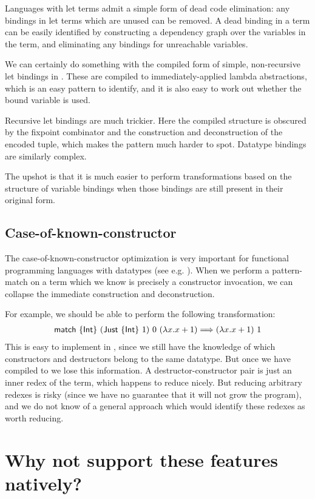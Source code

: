 Languages with let terms admit a simple form of dead code elimination: any
bindings in let terms which are unused can be removed. A dead binding in a
\FIR{} term can be easily identified by
constructing a dependency graph over the variables in the term, and eliminating
any bindings for unreachable variables.

We can certainly do something with the compiled form of simple, non-recursive let bindings
in \FOMF{}. These are compiled to immediately-applied
lambda abstractions, which is an easy pattern to identify, and it is also
easy to work out whether the bound variable is used.

Recursive let bindings are much trickier. Here the compiled structure is
obscured by the fixpoint combinator and the construction and deconstruction of
the encoded tuple, which makes the pattern much harder to spot. Datatype
bindings are similarly complex.

The upshot is that it is much easier to perform transformations based on the
structure of variable bindings when those bindings are still present in their
original form.

\subsection{Case-of-known-constructor}

The case-of-known-constructor optimization is very important for functional
programming languages with datatypes (see e.g. \cite[section
5]{jones1998transformation}).
When we perform a pattern-match on a term which we know is precisely a constructor
invocation, we can collapse the immediate construction and deconstruction.

For example, we should be able to perform the following transformation:
\begin{align*}
  \operatorname{\textsf{match}}\ \{\operatorname{\textsf{Int}}\}\ (\operatorname{\textsf{Just}}\ \{\operatorname{\textsf{Int}}\}\ 1)\ 0\ (\lambda x . x+1) \Longrightarrow (\lambda x . x+1)\ 1
\end{align*}
This is easy to implement in \FIR{}, since we still have the
knowledge of which constructors and destructors belong to the same datatype. But
once we have compiled to \FOMF{} we lose this information. A
destructor-constructor pair is just an inner redex of the term, which
happens to reduce nicely. But reducing arbitrary redexes is
risky (since we have no guarantee that it will not grow the program), and we do not know of a general
approach which would identify these redexes as worth reducing.

\section{Why not support these features natively?}

